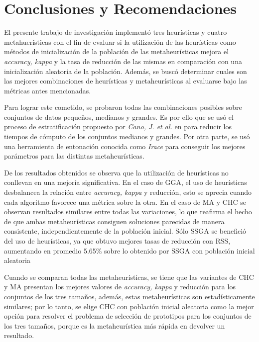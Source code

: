 \chapter*{Conclusiones y Recomendaciones}
\label{conclusiones}

El presente trabajo de investigación implementó tres heurísticas y cuatro metahuerísticas con el fin de evaluar si la utilización de las heurísticas como métodos de inicialización de la población de las metaheurísticas mejora el \emph{accuracy, kappa} y la tasa de reducción de las mismas en comparación con una inicialización aleatoria de la población. Además, se buscó determinar cuales son las mejores combinaciones de heurísticas y metaheurísticas al evaluarse bajo las métricas antes mencionadas.

Para lograr este cometido, se probaron todas las combinaciones posibles sobre conjuntos de datos pequeños, medianos y grandes. Es por ello que se usó el proceso de estratificación propuesto por \emph{Cano, J. et al.} en \cite{cano2005stratification} para reducir los tiempos de cómputo de los conjuntos medianos y grandes. Por otra parte, se usó una herramienta de entonación conocida como \emph{Irace} para conseguir los mejores parámetros para las distintas metaheurísticas.

De los resultados obtenidos se observa que la utilización de heurísticas no conllevan en una mejoría significativa. En el caso de GGA, el uso de heurísticas desbalancea la relación entre \emph{accuracy, kappa} y reducción, esto se aprecia cuando cada algoritmo favorece una métrica sobre la otra. En el caso de MA y CHC se observan resultados similares entre todas las variaciones, lo que reafirma el hecho de que ambas metaheurísticas consiguen soluciones parecidas de manera consistente, independientemente de la población inicial. Sólo SSGA se benefició del uso de heurísticas, ya que obtuvo mejores tasas de reducción con RSS, aumentando en promedio 5.65\% sobre lo obtenido por SSGA con población inicial aleatoria

Cuando se comparan todas las metaheurísticas, se tiene que las variantes de CHC y MA presentan los mejores valores de \emph{accuracy, kappa} y reducción para los conjuntos de los tres tamaños, además, estas metaheurísticas son estadísticamente similares; por lo tanto, se elige CHC con población inicial aleatoria como la mejor opción para resolver el problema de selección de prototipos para los conjuntos de los tres tamaños, porque es la metaheurística más rápida en devolver un resultado. 

